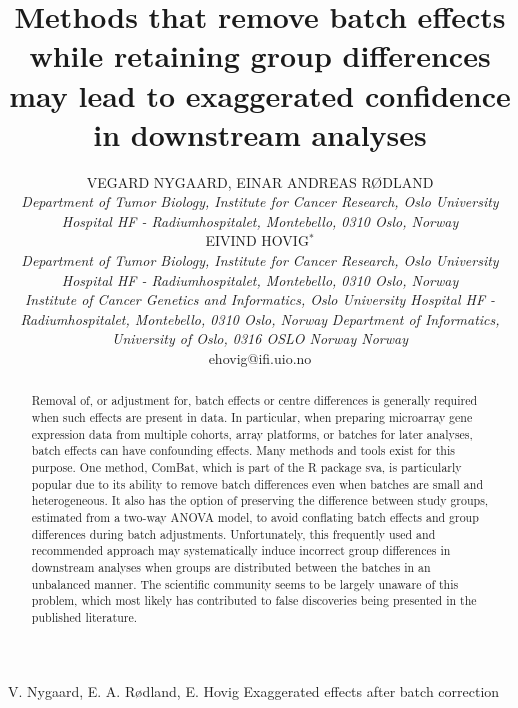 \documentclass{bio}
\begin{document}

\title{Methods that remove batch effects while retaining group differences may lead
to exaggerated confidence in downstream analyses
}

\author{VEGARD NYGAARD, EINAR ANDREAS RØDLAND\\[4pt]
\textit{Department of Tumor Biology,
Institute for Cancer Research,
Oslo University Hospital HF - Radiumhospitalet,
Montebello,
0310 Oslo,
Norway}
\\[8pt]
EIVIND HOVIG$^\ast$\\[4pt]
\textit{Department of Tumor Biology,
Institute for Cancer Research,
Oslo University Hospital HF - Radiumhospitalet,
Montebello,
0310 Oslo,
Norway}
\\[2pt]
\textit{Institute of Cancer Genetics and Informatics, Oslo University Hospital HF - Radiumhospitalet,
Montebello, 
0310 Oslo,
Norway}
\textit{Department of Informatics, University of Oslo, 
0316 OSLO
Norway
Norway}
\\[2pt]
{ehovig@ifi.uio.no}}

\markboth%
{V. Nygaard, E. A. Rødland, E. Hovig}
{Exaggerated effects after batch correction}


\maketitle



\begin{abstract}
{Removal of, or adjustment for, batch effects or centre differences is generally required when such effects are present in data. In particular, when preparing microarray gene expression data from multiple cohorts, array platforms, or batches for later analyses, batch effects can have confounding effects. Many methods and tools exist for this purpose. One method, ComBat, which is part of the R package sva, is particularly popular due to its ability to remove batch differences even when batches are small and heterogeneous. It also has the option of preserving the difference between study groups, estimated from a two-way ANOVA model, to avoid conflating batch effects and group differences during batch adjustments. Unfortunately, this frequently used and recommended approach may systematically induce incorrect group differences in downstream analyses when groups are distributed between the batches in an unbalanced manner. The scientific community seems to be largely unaware of this problem, which most likely has contributed to false discoveries being presented in the published literature.
}
\end{abstract}
\end{document}
